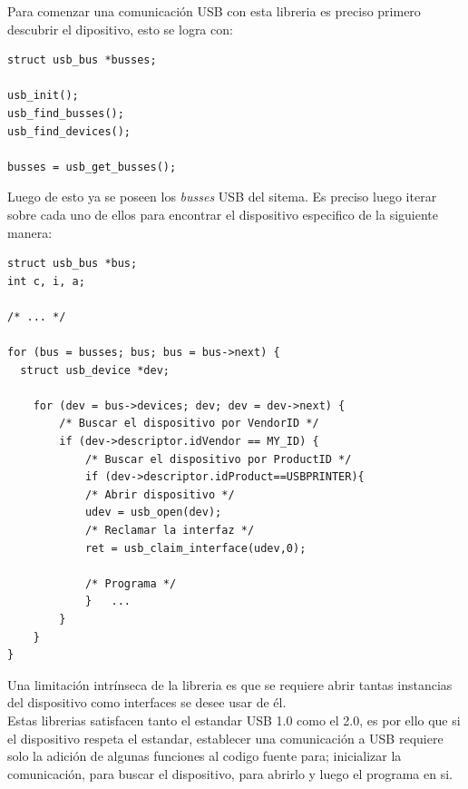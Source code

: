

Para comenzar una comunicaci\'on USB con esta libreria es preciso primero
descubrir el dipositivo, esto se logra con:

\begin{lstlisting}
struct usb_bus *busses;
    
usb_init();
usb_find_busses();
usb_find_devices();
    
busses = usb_get_busses();
\end{lstlisting}

Luego de esto ya se poseen los \emph{busses} USB del sitema. Es preciso luego
iterar sobre cada uno de ellos para encontrar el dispositivo especifico de la
siguiente manera:

\begin{lstlisting}
struct usb_bus *bus;
int c, i, a;
    
/* ... */
    
for (bus = busses; bus; bus = bus->next) {
  struct usb_device *dev;
    
    for (dev = bus->devices; dev; dev = dev->next) {
        /* Buscar el dispositivo por VendorID */
        if (dev->descriptor.idVendor == MY_ID) {
            /* Buscar el dispositivo por ProductID */
            if (dev->descriptor.idProduct==USBPRINTER){
            /* Abrir dispositivo */
            udev = usb_open(dev);
            /* Reclamar la interfaz */
            ret = usb_claim_interface(udev,0); 

            /* Programa */
            }	...
        }
    }
}
\end{lstlisting}

Una limitaci\'on intr\'inseca de la libreria es que se requiere abrir tantas
instancias del dispositivo como interfaces se desee usar de \'el.\\

Estas librerias satisfacen tanto el estandar USB 1.0 como el 2.0, es por ello
que si el dispositivo respeta el estandar, establecer una comunicaci\'on a
USB requiere solo la adici\'on de algunas funciones al codigo fuente para;
inicializar la comunicaci\'on, para buscar el dispositivo, para abrirlo y
luego el programa en si.

